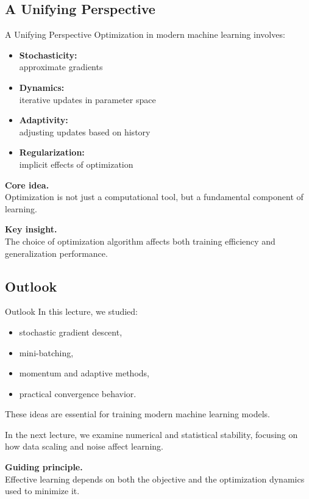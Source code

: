 \documentclass[aspectratio=169,11pt]{beamer}
\begin{document}
\subsection{A Unifying Perspective}
\begin{frame}[t,allowframebreaks]{A Unifying Perspective}
\small
Optimization in modern machine learning involves:

\begin{itemize}
    \item \textbf{Stochasticity:}\\ approximate gradients
    \item \textbf{Dynamics:}\\ iterative updates in parameter space
    \item \textbf{Adaptivity:}\\ adjusting updates based on history
    \item \textbf{Regularization:}\\ implicit effects of optimization
\end{itemize}

\textbf{Core idea.}\\ Optimization is not just a computational tool, but a fundamental component of learning.

\textbf{Key insight.}\\ The choice of optimization algorithm affects both training efficiency and generalization performance.
\end{frame}

\subsection{Outlook}
\begin{frame}[t,allowframebreaks]{Outlook}
\small
In this lecture, we studied:

\begin{itemize}
    \item stochastic gradient descent,
    \item mini-batching,
    \item momentum and adaptive methods,
    \item practical convergence behavior.
\end{itemize}

These ideas are essential for training modern machine learning models.

In the next lecture, we examine numerical and statistical stability, focusing on how data scaling and noise affect learning.

\textbf{Guiding principle.}\\ Effective learning depends on both the objective and the optimization dynamics used to minimize it.
\end{frame}
\end{document}
